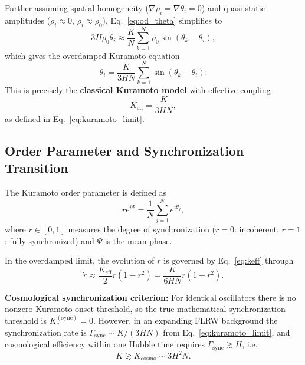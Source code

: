 Further assuming spatial homogeneity ($\nabla\rho_i = \nabla\theta_i = 0$) and quasi-static amplitudes ($\dot{\rho}_i \approx 0$, $\rho_i \approx \rho_0$), Eq.~\eqref{eq:od_theta} simplifies to
\begin{equation}
\label{eq:od_hom_theta}
3H\rho_0\dot{\theta}_i \approx \frac{K}{N}\sum_{k=1}^N \rho_0\sin(\theta_k - \theta_i),
\end{equation}
which gives the overdamped Kuramoto equation
\begin{equation}
\label{eq:kuramoto_limit}
\dot{\theta}_i = \frac{K}{3HN}\sum_{k=1}^N \sin(\theta_k - \theta_i).
\end{equation}
This is precisely the \textbf{classical Kuramoto model} with effective coupling
\begin{equation}
\label{eq:keff}
K_{\mathrm{eff}} = \frac{K}{3HN},
\end{equation}
as defined in Eq.~\eqref{eq:kuramoto_limit}.

\subsection{Order Parameter and Synchronization Transition}

The Kuramoto order parameter is defined as
\begin{equation}
\label{eq:order_param}
r e^{i\Psi} = \frac{1}{N}\sum_{j=1}^N e^{i\theta_j},
\end{equation}
where $r \in [0,1]$ measures the degree of synchronization ($r=0$: incoherent, $r=1$: fully synchronized) and $\Psi$ is the mean phase.

In the overdamped limit, the evolution of $r$ is governed by Eq.~\eqref{eq:keff} through
\begin{equation}
\label{eq:r_evolution}
\dot{r} \approx \frac{K_{\mathrm{eff}}}{2}r(1 - r^2) = \frac{K}{6HN}r(1 - r^2).
\end{equation}

\textbf{Cosmological synchronization criterion:} For identical oscillators there is no nonzero Kuramoto onset threshold, so the true mathematical synchronization threshold is $K_c^{(\mathrm{sync})}=0$. However, in an expanding FLRW background the synchronization rate is $\Gamma_{\mathrm{sync}}\sim K/(3HN)$ from Eq.~\eqref{eq:kuramoto_limit}, and cosmological efficiency within one Hubble time requires $\Gamma_{\mathrm{sync}}\gtrsim H$, i.e.
\begin{equation}
\label{eq:sync_threshold}
K \gtrsim K_{\mathrm{cosmo}} \sim 3H^2N.
\end{equation}

